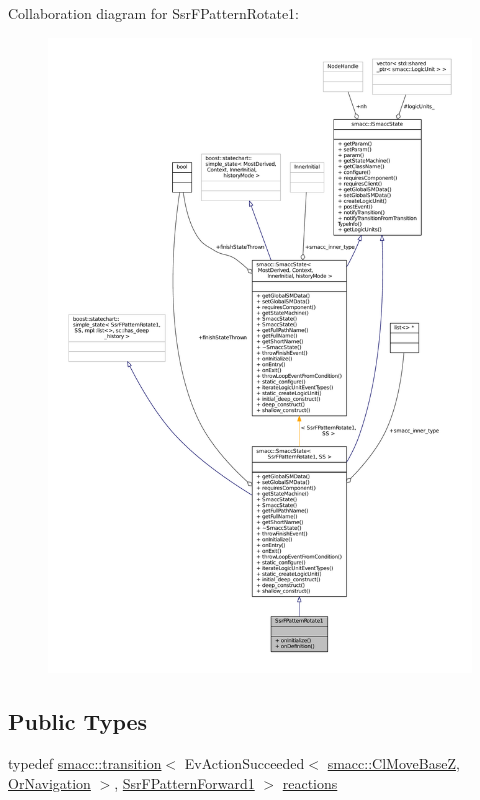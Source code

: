 Collaboration diagram for Ssr\+F\+Pattern\+Rotate1\+:
\nopagebreak
\begin{figure}[H]
\begin{center}
\leavevmode
\includegraphics[width=350pt]{structSsrFPatternRotate1__coll__graph}
\end{center}
\end{figure}
\subsection*{Public Types}
\begin{DoxyCompactItemize}
\item 
typedef \hyperlink{classsmacc_1_1transition}{smacc\+::transition}$<$ Ev\+Action\+Succeeded$<$ \hyperlink{classsmacc_1_1ClMoveBaseZ}{smacc\+::\+Cl\+Move\+BaseZ}, \hyperlink{classOrNavigation}{Or\+Navigation} $>$, \hyperlink{structSsrFPatternForward1}{Ssr\+F\+Pattern\+Forward1} $>$ \hyperlink{structSsrFPatternRotate1_a9525313b5aaa3d32678446231617e83e}{reactions}
\end{DoxyCompactItemize}
